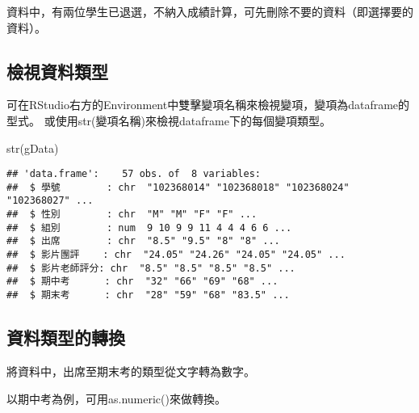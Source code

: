 \documentclass[
]{book}
\newenvironment{Shaded}{\begin{snugshade}}{\end{snugshade}}
\newcommand{\FunctionTok}[1]{\textcolor[rgb]{0.00,0.00,0.00}{#1}}
\newcommand{\NormalTok}[1]{#1}
\newcommand{\OtherTok}[1]{\textcolor[rgb]{0.56,0.35,0.01}{#1}}
\newcommand{\SpecialCharTok}[1]{\textcolor[rgb]{0.00,0.00,0.00}{#1}}
\newcommand{\StringTok}[1]{\textcolor[rgb]{0.31,0.60,0.02}{#1}}
\begin{document}
資料中，有兩位學生已退選，不納入成績計算，可先刪除不要的資料（即選擇要的資料）。

\begin{Shaded}
\end{Shaded}

\hypertarget{ux6aa2ux8996ux8cc7ux6599ux985eux578b}{%
\subsection{檢視資料類型}\label{ux6aa2ux8996ux8cc7ux6599ux985eux578b}}

可在RStudio右方的Environment中雙擊變項名稱來檢視變項，變項為dataframe的型式。 或使用str(變項名稱)來檢視dataframe下的每個變項類型。

\begin{Shaded}
\begin{Highlighting}[]
\FunctionTok{str}\NormalTok{(gData)}
\end{Highlighting}
\end{Shaded}

\begin{verbatim}
## 'data.frame':    57 obs. of  8 variables:
##  $ 學號        : chr  "102368014" "102368018" "102368024" "102368027" ...
##  $ 性別        : chr  "M" "M" "F" "F" ...
##  $ 組別        : num  9 10 9 9 11 4 4 4 6 6 ...
##  $ 出席        : chr  "8.5" "9.5" "8" "8" ...
##  $ 影片團評    : chr  "24.05" "24.26" "24.05" "24.05" ...
##  $ 影片老師評分: chr  "8.5" "8.5" "8.5" "8.5" ...
##  $ 期中考      : chr  "32" "66" "69" "68" ...
##  $ 期末考      : chr  "28" "59" "68" "83.5" ...
\end{verbatim}

\hypertarget{ux8cc7ux6599ux985eux578bux7684ux8f49ux63db}{%
\subsection{資料類型的轉換}\label{ux8cc7ux6599ux985eux578bux7684ux8f49ux63db}}

將資料中，出席至期末考的類型從文字轉為數字。

以期中考為例，可用as.numeric()來做轉換。

\begin{Shaded}
\end{Shaded}
\end{document}
